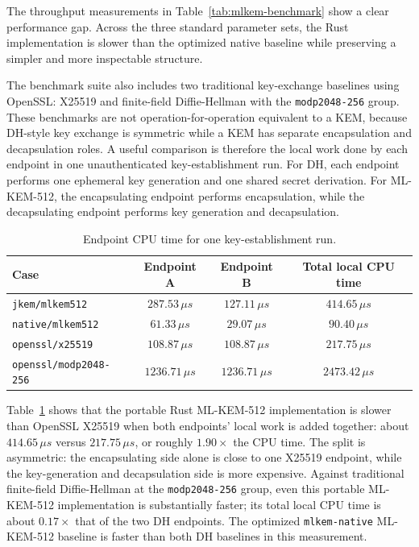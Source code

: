 The throughput measurements in Table~\ref{tab:mlkem-benchmark} show a clear performance gap. Across the three standard parameter sets, the Rust implementation is slower than the optimized native baseline while preserving a simpler and more inspectable structure.

The benchmark suite also includes two traditional key-exchange baselines using OpenSSL: X25519 and finite-field Diffie-Hellman with the \texttt{modp2048-256} group. These benchmarks are not operation-for-operation equivalent to a KEM, because DH-style key exchange is symmetric while a KEM has separate encapsulation and decapsulation roles. A useful comparison is therefore the local work done by each endpoint in one unauthenticated key-establishment run. For DH, each endpoint performs one ephemeral key generation and one shared secret derivation. For ML-KEM-512, the encapsulating endpoint performs encapsulation, while the decapsulating endpoint performs key generation and decapsulation.

\begin{table}[htbp]
    \centering
    \caption{Endpoint CPU time for one key-establishment run.}
    \label{tab:kx-endpoint-time}
    \begin{tabular}{l c c c}
        \toprule
        \textbf{Case} &
        \textbf{Endpoint A} &
        \textbf{Endpoint B} &
        \textbf{Total local CPU time} \\
        \midrule
        \texttt{jkem/mlkem512} &
        $287.53\,\mu s$ &
        $127.11\,\mu s$ &
        $414.65\,\mu s$ \\
        \texttt{native/mlkem512} &
        $61.33\,\mu s$ &
        $29.07\,\mu s$ &
        $90.40\,\mu s$ \\
        \texttt{openssl/x25519} &
        $108.87\,\mu s$ &
        $108.87\,\mu s$ &
        $217.75\,\mu s$ \\
        \texttt{openssl/modp2048-256} &
        $1236.71\,\mu s$ &
        $1236.71\,\mu s$ &
        $2473.42\,\mu s$ \\
        \bottomrule
    \end{tabular}
\end{table}

Table~\ref{tab:kx-endpoint-time} shows that the portable Rust ML-KEM-512 implementation is slower than OpenSSL X25519 when both endpoints' local work is added together: about $414.65\,\mu s$ versus $217.75\,\mu s$, or roughly $1.90\times$ the CPU time. The split is asymmetric: the encapsulating side alone is close to one X25519 endpoint, while the key-generation and decapsulation side is more expensive. Against traditional finite-field Diffie-Hellman at the \texttt{modp2048-256} group, even this portable ML-KEM-512 implementation is substantially faster; its total local CPU time is about $0.17\times$ that of the two DH endpoints. The optimized \texttt{mlkem-native} ML-KEM-512 baseline is faster than both DH baselines in this measurement.

